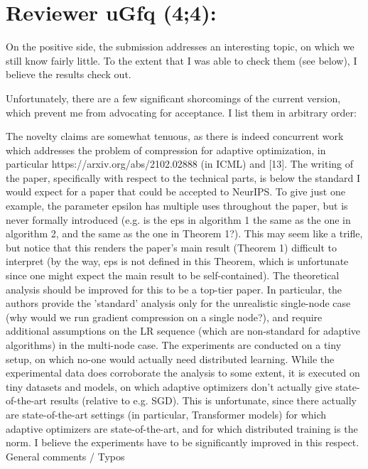 \documentclass{article}
\begin{document}
\section{Reviewer uGfq (4;4):}


On the positive side, the submission addresses an interesting topic, on which we still know fairly little. To the extent that I was able to check them (see below), I believe the results check out.

Unfortunately, there are a few significant shorcomings of the current version, which prevent me from advocating for acceptance. I list them in arbitrary order:

The novelty claims are somewhat tenuous, as there is indeed concurrent work which addresses the problem of compression for adaptive optimization, in particular https://arxiv.org/abs/2102.02888 (in ICML) and [13].
The writing of the paper, specifically with respect to the technical parts, is below the standard I would expect for a paper that could be accepted to NeurIPS. To give just one example, the parameter epsilon has multiple uses throughout the paper, but is never formally introduced (e.g. is the eps in algorithm 1 the same as the one in algorithm 2, and the same as the one in Theorem 1?). This may seem like a trifle, but notice that this renders the paper's main result (Theorem 1) difficult to interpret (by the way, eps is not defined in this Theorem, which is unfortunate since one might expect the main result to be self-contained).
The theoretical analysis should be improved for this to be a top-tier paper. In particular, the authors provide the 'standard' analysis only for the unrealistic single-node case (why would we run gradient compression on a single node?), and require additional assumptions on the LR sequence (which are non-standard for adaptive algorithms) in the multi-node case.
The experiments are conducted on a tiny setup, on which no-one would actually need distributed learning. While the experimental data does corroborate the analysis to some extent, it is executed on tiny datasets and models, on which adaptive optimizers don't actually give state-of-the-art results (relative to e.g. SGD). This is unfortunate, since there actually are state-of-the-art settings (in particular, Transformer models) for which adaptive optimizers are state-of-the-art, and for which distributed training is the norm. I believe the experiments have to be significantly improved in this respect.
General comments / Typos
\end{document}
